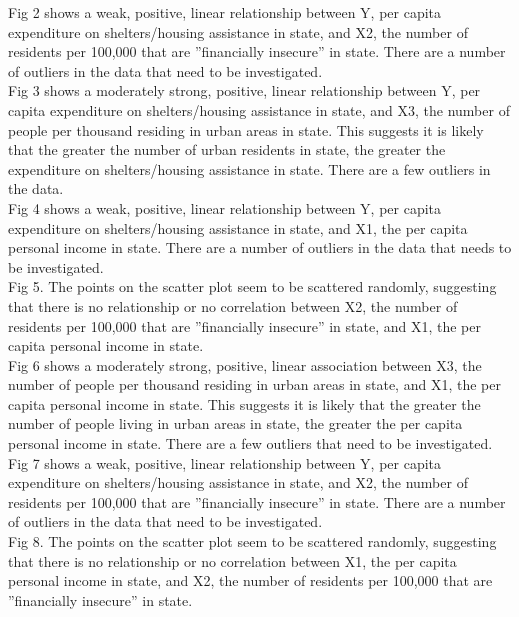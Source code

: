 \documentclass[12pt,letterpaper]{article}
\begin{document}
\begin{itemize}
\noindent Fig 2 shows a weak, positive, linear relationship between Y, per capita expenditure on shelters/housing assistance in state, and X2, the number of residents per 100,000 that are ”financially insecure” in state. There are a number of outliers in the data that need to be investigated.\\

\noindent Fig 3 shows a moderately strong, positive, linear relationship between Y, per capita expenditure on shelters/housing assistance in state, and X3, the number of people per thousand residing in urban areas in state. This suggests it is likely that the greater the number of urban residents in state, the greater the expenditure on shelters/housing assistance in state. There are a few outliers in the data.\\ 

\noindent Fig 4 shows a weak, positive, linear relationship between Y, per capita expenditure on shelters/housing assistance in state, and X1, the per capita personal income in state. There are a number of outliers in the data that needs to be investigated.\\

\noindent Fig 5. The points on the scatter plot seem to be scattered randomly, suggesting that there is no relationship or no correlation between X2, the number of residents per 100,000 that are ”financially insecure” in state, and X1, the per capita personal income in state.\\

\noindent Fig 6 shows a moderately strong, positive, linear association between X3, the number of people per thousand residing in urban areas in state, and X1, the per capita personal income in state. This suggests it is likely that the greater the number of people living in urban areas in state, the greater the per capita personal income in state. There are a few outliers that need to be investigated.\\

\noindent Fig 7 shows a weak, positive, linear relationship between Y, per capita expenditure on shelters/housing assistance in state, and X2, the number of residents per 100,000 that are ”financially insecure” in state. There are a number of outliers in the data that need to be investigated.\\

\noindent Fig 8. The points on the scatter plot seem to be scattered randomly, suggesting that there is no relationship or no correlation between X1, the per capita personal income in state, and X2, the number of residents per 100,000 that are ”financially insecure” in state.\\


\end{itemize}
\end{document}
